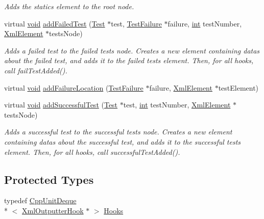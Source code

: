 \begin{DoxyCompactItemize}
\begin{DoxyCompactList}\small\item\em Adds the statics element to the root node. \end{DoxyCompactList}\item 
virtual \hyperlink{wglew_8h_aeea6e3dfae3acf232096f57d2d57f084}{void} \hyperlink{class_xml_outputter_abbe12c670f490cbe29b8be6d9ff174e6}{add\-Failed\-Test} (\hyperlink{class_test}{Test} $\ast$test, \hyperlink{class_test_failure}{Test\-Failure} $\ast$failure, \hyperlink{wglew_8h_a500a82aecba06f4550f6849b8099ca21}{int} test\-Number, \hyperlink{class_xml_element}{Xml\-Element} $\ast$tests\-Node)
\begin{DoxyCompactList}\small\item\em Adds a failed test to the failed tests node. Creates a new element containing datas about the failed test, and adds it to the failed tests element. Then, for all hooks, call fail\-Test\-Added(). \end{DoxyCompactList}\item 
virtual \hyperlink{wglew_8h_aeea6e3dfae3acf232096f57d2d57f084}{void} \hyperlink{class_xml_outputter_a1afa9344722155ae8ea3d7d67493ade3}{add\-Failure\-Location} (\hyperlink{class_test_failure}{Test\-Failure} $\ast$failure, \hyperlink{class_xml_element}{Xml\-Element} $\ast$test\-Element)
\item 
virtual \hyperlink{wglew_8h_aeea6e3dfae3acf232096f57d2d57f084}{void} \hyperlink{class_xml_outputter_a025e0e041db1ec557e9af2887a24dd9e}{add\-Successful\-Test} (\hyperlink{class_test}{Test} $\ast$test, \hyperlink{wglew_8h_a500a82aecba06f4550f6849b8099ca21}{int} test\-Number, \hyperlink{class_xml_element}{Xml\-Element} $\ast$tests\-Node)
\begin{DoxyCompactList}\small\item\em Adds a successful test to the successful tests node. Creates a new element containing datas about the successful test, and adds it to the successful tests element. Then, for all hooks, call successful\-Test\-Added(). \end{DoxyCompactList}\end{DoxyCompactItemize}
\subsection*{Protected Types}
\begin{DoxyCompactItemize}
\item 
typedef \hyperlink{_cpp_unit_deque_8h_a3425728ebb9dff4afd4dcb7e6f270905}{Cpp\-Unit\-Deque}\\*
$<$ \hyperlink{class_xml_outputter_hook}{Xml\-Outputter\-Hook} $\ast$ $>$ \hyperlink{class_xml_outputter_a721fa60bda8d779457ae8e429be21d74}{Hooks}
\end{DoxyCompactItemize}
